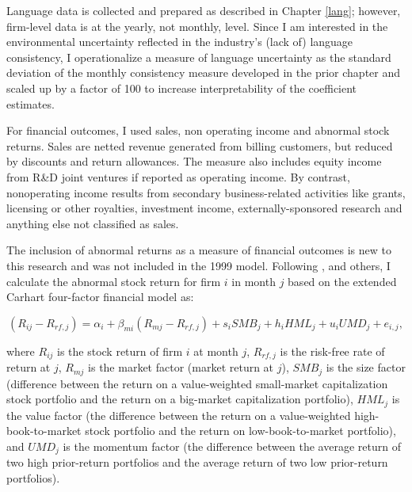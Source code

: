 Language data is collected and prepared as described in Chapter \ref{lang}; however, firm-level data is at the yearly, not monthly, level. Since I am interested in the environmental uncertainty reflected in the industry's (lack of) language consistency, I operationalize a measure of language uncertainty as the standard deviation of the monthly consistency measure developed in the prior chapter and scaled up by a factor of 100 to increase interpretability of the coefficient estimates.

For financial outcomes, I used sales, non operating income and abnormal stock returns. Sales are netted revenue generated from billing customers, but reduced by discounts and return allowances. The measure also includes equity income from R\&D joint ventures if reported as operating income. By contrast, nonoperating income results from secondary business-related activities like grants, licensing or other royalties, investment income, externally-sponsored research and anything else not classified as sales.

The inclusion of abnormal returns as a measure of financial outcomes is new to this research and was not included in the 1999 model. Following \citet{srinivasan2009}, \citet{xiong2013} and others, I calculate the abnormal stock return for firm $i$ in month $j$ based on the extended Carhart four-factor financial model \citep{carhart1997} as:

\begin{equation}\label{ff}
(R_{ij}-R_{rf,j}) = \alpha_i + \beta_{mi}(R_{mj}-R_{rf,j}) + s_iSMB_j + h_iHML_j + u_iUMD_j + e_{i,j},
\end{equation}

\noindent where $R_{ij}$ is the stock return of firm $i$ at month $j$, $R_{rf,j}$ is the risk-free rate of return at $j$, $R_{mj}$ is the market factor (market return at $j$), $SMB_j$ is the size factor (difference between the return on a value-weighted small-market capitalization stock portfolio and the return on a big-market capitalization portfolio), $HML_j$ is the value factor (the difference between the return on a value-weighted high-book-to-market stock portfolio and the return on low-book-to-market portfolio), and $UMD_j$ is the momentum factor (the difference between the average return of two high prior-return portfolios and the average return of two low prior-return portfolios).

